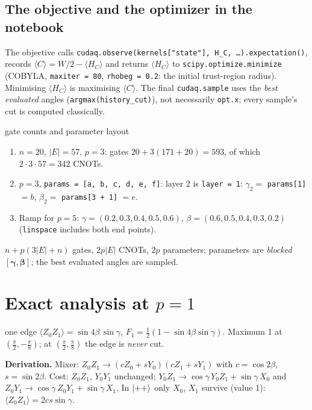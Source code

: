 \documentclass[11pt,a4paper,openany]{book}
\newcounter{wex}[chapter]
\newenvironment{steps}{\begin{enumerate}[label=\textbf{Step \arabic*.}, leftmargin=4.2em, itemsep=2pt]}{\end{enumerate}}
\newcommand{\bg}{\boldsymbol\gamma}
\newcommand{\bb}{\boldsymbol\beta}
\begin{document}
\subsection{The objective and the optimizer in the notebook}
The objective calls \texttt{cudaq.observe(kernels["state"], H\_C, \dots).expectation()}, records $\langle C\rangle = W/2 - \langle H_C\rangle$ and returns
$\langle H_C\rangle$ to \texttt{scipy.optimize.minimize} (COBYLA, \texttt{maxiter = 80}, \texttt{rhobeg = 0.2}: the initial trust-region radius).
Minimising $\langle H_C\rangle$ is maximising $\langle C\rangle$. The final \texttt{cudaq.sample} uses the \emph{best evaluated} angles
(\texttt{argmax(history\_cut)}), not necessarily \texttt{opt.x}; every sample's cut is computed classically.

\begin{wexample}{gate counts and parameter layout}
\begin{steps}
\item $n = 20$, $|E| = 57$, $p = 3$: gates $20 + 3(171 + 20) = 593$, of which $2\cdot3\cdot57 = 342$ CNOTs.
\item $p = 3$, \texttt{params = [a, b, c, d, e, f]}: layer 2 is \texttt{layer = 1}: $\gamma_2 = $ \texttt{params[1]} $= b$, $\beta_2 = $ \texttt{params[3 + 1]} $= e$.
\item Ramp for $p = 5$: $\gamma = (0.2, 0.3, 0.4, 0.5, 0.6)$, $\beta = (0.6, 0.5, 0.4, 0.3, 0.2)$ (\texttt{linspace} includes both end points).
\end{steps}
\end{wexample}
\begin{checklist}
$n + p(3|E| + n)$ gates, $2p|E|$ CNOTs, $2p$ parameters; parameters are \emph{blocked} $[\bg, \bb]$; the best evaluated angles are sampled.
\end{checklist}

\section{Exact analysis at $p = 1$}
\begin{keyres}{one edge}
$\langle Z_0Z_1\rangle = \sin4\beta\,\sin\gamma$, \qquad $F_1 = \frac12(1 - \sin4\beta\sin\gamma)$.
Maximum 1 at $(\frac\pi2, -\frac\pi8)$; at $(\frac\pi2, \frac\pi8)$ the edge is \emph{never} cut.
\end{keyres}
\textbf{Derivation.} Mixer: $Z_0Z_1 \to (cZ_0 + sY_0)(cZ_1 + sY_1)$ with $c = \cos2\beta$, $s = \sin2\beta$. Cost: $Z_0Z_1$, $Y_0Y_1$ unchanged;
$Y_0Z_1 \to \cos\gamma\,Y_0Z_1 + \sin\gamma\,X_0$ and $Z_0Y_1 \to \cos\gamma\,Z_0Y_1 + \sin\gamma\,X_1$. In $\ket{++}$ only $X_0$, $X_1$ survive (value 1):
$\langle Z_0Z_1\rangle = 2cs\sin\gamma$.
\end{document}
